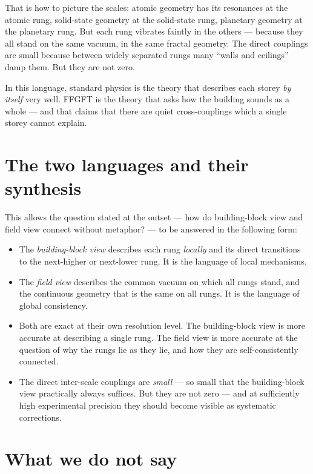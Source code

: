 That is how to picture the scales: atomic geometry has its
resonances at the atomic rung, solid-state geometry at the
solid-state rung, planetary geometry at the planetary rung. But
each rung vibrates faintly in the others --- because they all stand
on the same vacuum, in the same fractal geometry. The direct
couplings are small because between widely separated rungs many
``walls and ceilings'' damp them. But they are not zero.

In this language, standard physics is the theory that describes
each storey \emph{by itself} very well. FFGFT is the theory that
asks how the building sounds as a whole --- and that claims that
there are quiet cross-couplings which a single storey cannot
explain.

\section{The two languages and their synthesis}

This allows the question stated at the outset --- how do
building-block view and field view connect without metaphor? --- to
be answered in the following form:

\begin{itemize}\setlength\itemsep{2pt}
  \item The \emph{building-block view} describes each rung
        \emph{locally} and its direct transitions to the next-higher
        or next-lower rung. It is the language of local mechanisms.
  \item The \emph{field view} describes the common vacuum on which
        all rungs stand, and the continuous geometry that is the
        same on all rungs. It is the language of global
        consistency.
  \item Both are exact at their own resolution level. The
        building-block view is more accurate at describing a single
        rung. The field view is more accurate at the question of
        why the rungs lie as they lie, and how they are
        self-consistently connected.
  \item The direct inter-scale couplings are \emph{small} --- so
        small that the building-block view practically always
        suffices. But they are not zero --- and at sufficiently
        high experimental precision they should become visible as
        systematic corrections.
\end{itemize}

\section{What we do not say}

